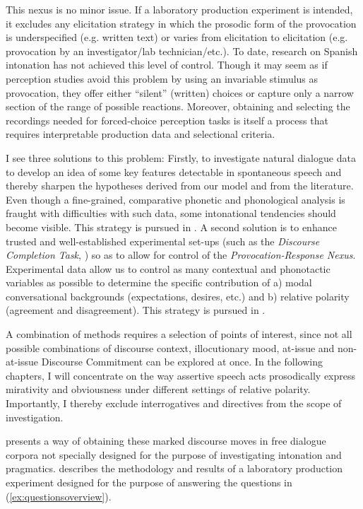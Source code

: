 This nexus is no minor issue. If a laboratory production experiment is intended, it excludes any elicitation strategy in which the prosodic form of the provocation is underspecified (e.g. written text) or varies from elicitation to elicitation (e.g. provocation by an investigator/lab technician/etc.). To date, research on Spanish intonation has not achieved this level of control. Though it may seem as if perception studies avoid this problem by using an invariable stimulus as provocation, they offer either ``silent'' (written) choices or capture only a narrow section of the range of possible reactions. Moreover, obtaining and selecting the recordings needed for forced-choice perception tasks is itself a process that requires interpretable production data and selectional criteria.

I see three solutions to this problem: Firstly, to investigate natural dialogue data to develop an idea of some key features detectable in spontaneous speech and thereby sharpen the hypotheses derived from our model and from the literature. Even though a fine-grained, comparative phonetic and phonological analysis is fraught with difficulties with such data, some intonational tendencies should become visible. This strategy is pursued in . A second solution is to enhance trusted and well-established experimental set-ups (such as the \textit{Discourse Completion Task}, \cite{VanrellFeldhausenAstruc.2018}) so as to allow for control of the \textit{Provocation-Response Nexus}. Experimental data allow us to control as many contextual and phonotactic variables as possible to determine the specific contribution of a) modal conversational backgrounds (expectations, desires, etc.) and b) relative polarity (agreement and disagreement). This strategy is pursued in .

A combination of methods requires a selection of points of interest, since not all possible combinations of discourse context, illocutionary mood, at-issue and non-at-issue Discourse Commitment can be explored at once. In the following chapters, I will concentrate on the way assertive speech acts prosodically express mirativity and obviousness under different settings of relative polarity. Importantly, I thereby exclude interrogatives and directives from the scope of investigation.

 presents a way of obtaining these marked discourse moves in free dialogue corpora not specially designed for the purpose of investigating intonation and pragmatics.  describes the methodology and results of a laboratory production experiment designed for the purpose of answering the questions in (\ref{ex:questionsoverview}).
